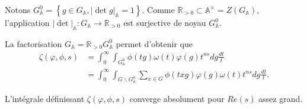 Notons $G^0_\mathbb{A}=\left\lbrace g \in G_\mathbb{A}, |\det g|_\mathbb{A} = 1 \right\rbrace$. Comme $\mathbb{R}_{> 0} \subset \mathbb{A}^\times=Z(G_\mathbb{A})$, l'application $|\det|_\mathbb{A} : G_\mathbb{A} \rightarrow \mathbb{R}_{> 0}$ est surjective de noyau $G^0_\mathbb{A}$.

La factorisation $G_\mathbb{A} = \mathbb{R}_{> 0}G^0_\mathbb{A}$ permet d'obtenir que
\begin{align}
\zeta(\varphi, \phi, s) &= \int_0^\infty \int_{G^0_\mathbb{A}} \phi(tg) \omega(t) \varphi(g) t^{ns} dg \frac{dt}{t} \\
&= \int_0^\infty \int_{G \backslash G^0_\mathbb{A}} \sum_{x \in G}{\phi(txg)} \varphi(g) \omega(t) t^{ns} dg \frac{dt}{t}.
\end{align}

\begin{lemme}
\label{lemme_convergence_globale}
L'intégrale définissant $\zeta(\varphi, \phi, s)$ converge absolument pour $Re(s)$ assez grand.
\end{lemme}

